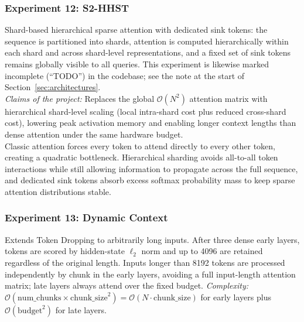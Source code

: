 \documentclass[11pt]{article}
\newcommand{\bigO}{\mathcal{O}}
\begin{document}
\subsubsection*{Experiment 12: S2-HHST}
\label{exp:s2hhst}
Shard-based hierarchical sparse attention with
dedicated sink tokens: the sequence is partitioned into shards, attention is
computed hierarchically within each shard and across shard-level
representations, and a fixed set of sink tokens remains globally visible to
all queries. This experiment is likewise marked incomplete (``TODO'') in the
codebase; see the note at the start of Section~\ref{sec:architectures}.\\
\emph{Claims of the project:} Replaces the global $\bigO(N^2)$ attention
matrix with hierarchical shard-level scaling (local intra-shard cost plus
reduced cross-shard cost), lowering peak activation memory and enabling
longer context lengths than dense attention under the same hardware budget.\\ 
Classic attention forces
every token to attend directly to every other token, creating a quadratic
bottleneck. Hierarchical sharding avoids all-to-all token interactions while
still allowing information to propagate across the full sequence, and
dedicated sink tokens absorb excess softmax probability mass to keep sparse
attention distributions stable.

\subsubsection*{Experiment 13: Dynamic Context}
\label{exp:dynamic-context}
Extends Token Dropping to arbitrarily long inputs. After three dense early
layers, tokens are scored by hidden-state $\ell_2$ norm and up to 4096 are
retained regardless of the original length. Inputs longer than 8192 tokens
are processed independently by chunk in the early layers, avoiding a full
input-length attention matrix; late layers always attend over the fixed
budget. \emph{Complexity:}
$\bigO(\mathrm{num\_chunks}\times\mathrm{chunk\_size}^2) = \bigO(N \cdot \mathrm{chunk\_size})$
for early layers plus $\bigO(\mathrm{budget}^2)$ for late layers.
\end{document}
